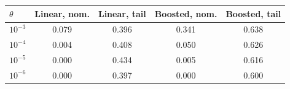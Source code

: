 \begin{tabular*}{\columnwidth}{@{\extracolsep{\fill}}lcccc@{}}
\toprule
$\theta$ & Linear, nom. & Linear, tail & Boosted, nom. & Boosted, tail\\
\midrule
$10^{-3}$ & 0.079 & 0.396 & 0.341 & 0.638\\
$10^{-4}$ & 0.004 & 0.408 & 0.050 & 0.626\\
$10^{-5}$ & 0.000 & 0.434 & 0.005 & 0.616\\
$10^{-6}$ & 0.000 & 0.397 & 0.000 & 0.600\\
\bottomrule
\end{tabular*}
